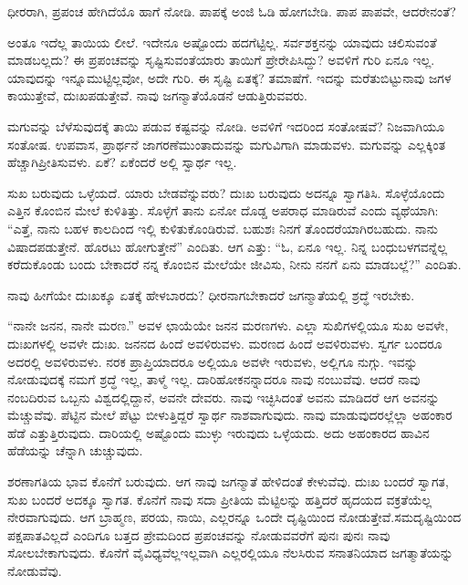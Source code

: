 ಧೀರರಾಗಿ, ಪ್ರಪಂಚ ಹೇಗಿದೆಯೊ ಹಾಗೆ ನೋಡಿ. ಪಾಪಕ್ಕೆ ಅಂಜಿ ಓಡಿ ಹೋಗಬೇಡಿ. ಪಾಪ ಪಾಪವೇ, ಆದರೇನಂತೆ?

ಅಂತೂ ಇದೆಲ್ಲ ತಾಯಿಯ ಲೀಲೆ. ಇದೇನೂ ಅಷ್ಟೊಂದು ಹದಗೆಟ್ಟಿಲ್ಲ. ಸರ್ವಶಕ್ತನನ್ನು ಯಾವುದು ಚಲಿಸುವಂತೆ ಮಾಡಬಲ್ಲದು? ಈ ಪ್ರಪಂಚವನ್ನು ಸೃಷ್ಟಿಸುವಂತೆ\break ಯಾರು ತಾಯಿಗೆ ಪ್ರೇರೇಪಿಸಿದ್ದು? ಅವಳಿಗೆ ಗುರಿ ಏನೂ ಇಲ್ಲ. ಯಾವುದನ್ನು ಇನ್ನೂ\break ಮುಟ್ಟಿಲ್ಲವೋ, ಅದೇ ಗುರಿ. ಈ ಸೃಷ್ಟಿ ಏತಕ್ಕೆ? ತಮಾಷೆಗೆ. ಇದನ್ನು ಮರೆತುಬಿಟ್ಟು\break ನಾವು ಜಗಳ ಕಾಯುತ್ತೇವೆ, ದುಃಖಪಡುತ್ತೇವೆ. ನಾವು ಜಗನ್ಮಾತೆಯೊಡನೆ ಆಡುತ್ತಿರುವವರು.

ಮಗುವನ್ನು ಬೆಳೆಸುವುದಕ್ಕೆ ತಾಯಿ ಪಡುವ ಕಷ್ಟವನ್ನು ನೋಡಿ. ಅವಳಿಗೆ ಇದರಿಂದ ಸಂತೋಷವೆ? ನಿಜವಾಗಿಯೂ ಸಂತೋಷ. ಉಪವಾಸ, ಪ್ರಾರ್ಥನೆ ಜಾಗರಣೆ\break ಮುಂತಾದುವನ್ನು ಮಗುವಿಗಾಗಿ ಮಾಡುವಳು. ಮಗುವನ್ನು ಎಲ್ಲಕ್ಕಿಂತ ಹೆಚ್ಚಾಗಿ\break ಪ್ರೀತಿಸುವಳು. ಏಕೆ? ಏಕೆಂದರೆ ಅಲ್ಲಿ ಸ್ವಾರ್ಥ ಇಲ್ಲ.

ಸುಖ ಬರುವುದು ಒಳ್ಳೆಯದೆ. ಯಾರು ಬೇಡವೆನ್ನುವರು? ದುಃಖ ಬರುವುದು ಅದನ್ನೂ ಸ್ವಾಗತಿಸಿ. ಸೊಳ್ಳೆಯೊಂದು ಎತ್ತಿನ ಕೊಂಬಿನ ಮೇಲೆ ಕುಳಿತಿತ್ತು. ಸೊಳ್ಳೆಗೆ ತಾನು ಏನೋ ದೊಡ್ಡ ಅಪರಾಧ ಮಾಡಿರುವೆ ಎಂದು ವ್ಯಥೆಯಾಗಿ: “ಎತ್ತೆ, ನಾನು ಬಹಳ ಕಾಲದಿಂದ ಇಲ್ಲಿ ಕುಳಿತುಕೊಂಡಿರುವೆ. ಬಹುಶಃ ನಿನಗೆ ತೊಂದರೆಯಾಗಿರಬಹುದು. ನಾನು ವಿಷಾದಪಡುತ್ತೇನೆ. ಹೊರಟು ಹೋಗುತ್ತೇನೆ” ಎಂದಿತು. ಆಗ ಎತ್ತು: “ಓ, ಏನೂ ಇಲ್ಲ. ನಿನ್ನ ಬಂಧುಬಳಗವನ್ನೆಲ್ಲ ಕರೆದುಕೊಂಡು ಬಂದು ಬೇಕಾದರೆ ನನ್ನ ಕೊಂಬಿನ ಮೇಲೆಯೇ ಜೀವಿಸು, ನೀನು ನನಗೆ ಏನು ಮಾಡಬಲ್ಲೆ?” ಎಂದಿತು.

ನಾವು ಹೀಗೆಯೇ ದುಃಖಕ್ಕೂ ಏತಕ್ಕೆ ಹೇಳಬಾರದು? ಧೀರನಾಗಬೇಕಾದರೆ ಜಗನ್ಮಾತೆಯಲ್ಲಿ ಶ್ರದ್ಧೆ ಇರಬೇಕು.

“ನಾನೇ ಜನನ, ನಾನೇ ಮರಣ.” ಅವಳ ಛಾಯೆಯೇ ಜನನ ಮರಣಗಳು. ಎಲ್ಲಾ ಸುಖಿಗಳಲ್ಲಿಯೂ ಸುಖ ಅವಳೇ, ದುಃಖಗಳಲ್ಲಿ ಅವಳೇ ದುಃಖ. ಜನನದ ಹಿಂದೆ ಅವಳಿರುವಳು. ಮರಣದ ಹಿಂದೆ ಅವಳಿರುವಳು. ಸ್ವರ್ಗ ಬಂದರೂ ಅದರಲ್ಲಿ ಅವಳಿರುವಳು. ನರಕ ಪ್ರಾಪ್ತಿಯಾದರೂ ಅಲ್ಲಿಯೂ ಅವಳೇ ಇರುವಳು, ಅಲ್ಲಿಗೂ ನುಗ್ಗು. ಇವನ್ನು ನೋಡುವುದಕ್ಕೆ ನಮಗೆ ಶ್ರದ್ಧೆ ಇಲ್ಲ, ತಾಳ್ಮೆ ಇಲ್ಲ. ದಾರಿಹೋಕನನ್ನಾದರೂ ನಾವು ನಂಬುವೆವು. ಆದರೆ ನಾವು ನಂಬದಿರುವ ಒಬ್ಬನು ವಿಶ್ವದಲ್ಲಿದ್ದಾನೆ, ಅವನೇ ದೇವರು. ನಾವು ಇಚ್ಛಿಸಿದಂತೆ ಅವನು ಮಾಡಿದರೆ ಆಗ ಅವನನ್ನು ಮೆಚ್ಚುವೆವು. ಪೆಟ್ಟಿನ ಮೇಲೆ ಪೆಟ್ಟು ಬೀಳುತ್ತಿದ್ದರೆ ಸ್ವಾರ್ಥ ನಾಶವಾಗುವುದು. ನಾವು ಮಾಡುವುದರಲ್ಲೆಲ್ಲಾ ಅಹಂಕಾರ ಹೆಡೆ ಎತ್ತುತ್ತಿರುವುದು. ದಾರಿಯಲ್ಲಿ ಅಷ್ಟೊಂದು ಮುಳ್ಳು ಇರುವುದು ಒಳ್ಳೆಯದು. ಅದು ಅಹಂಕಾರದ ಹಾವಿನ ಹೆಡೆಯನ್ನು ಚೆನ್ನಾಗಿ ಚುಚ್ಚುವುದು.

ಶರಣಾಗತಿಯ ಭಾವ ಕೊನೆಗೆ ಬರುವುದು. ಆಗ ನಾವು ಜಗನ್ಮಾತೆ ಹೇಳಿದಂತೆ ಕೇಳುವೆವು. ದುಃಖ ಬಂದರೆ ಸ್ವಾಗತ, ಸುಖ ಬಂದರೆ ಅದಕ್ಕೂ ಸ್ವಾಗತ. ಕೊನೆಗೆ ನಾವು ಸದಾ ಪ್ರೀತಿಯ ಮೆಟ್ಟಿಲನ್ನು ಹತ್ತಿದರೆ ಹೃದಯದ ವಕ್ರತೆಯೆಲ್ಲ ನೇರವಾಗುವುದು. ಆಗ ಬ್ರಾಹ್ಮಣ, ಪರಯ, ನಾಯಿ, ಎಲ್ಲರನ್ನೂ ಒಂದೇ ದೃಷ್ಟಿಯಿಂದ ನೋಡುತ್ತೇವೆ.\break ಸಮದೃಷ್ಟಿಯಿಂದ ಪಕ್ಷಪಾತವಿಲ್ಲದೆ ಎಂದಿಗೂ ಬತ್ತದ ಪ್ರೇಮದಿಂದ ಪ್ರಪಂಚವನ್ನು ನೋಡುವವರೆಗೆ ಪುನಃ ಪುನಃ ನಾವು ಸೋಲಬೇಕಾಗುವುದು. ಕೊನೆಗೆ ವೈವಿಧ್ಯವೆಲ್ಲ\break ಇಲ್ಲವಾಗಿ ಎಲ್ಲರಲ್ಲಿಯೂ ನೆಲಸಿರುವ ಸನಾತನಿಯಾದ ಜಗತ್ಮಾತೆಯನ್ನು ನೋಡುವೆವು.

